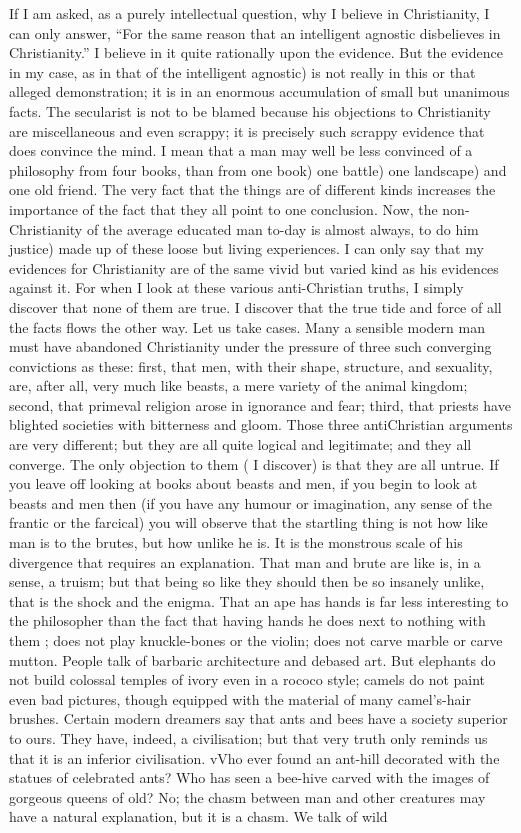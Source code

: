 \documentclass{book}
\begin{document}
If I am asked, as a purely intellectual question, why I believe in Christianity, I can only answer, “For the same reason that an intelligent agnostic disbelieves in Christianity.” I believe in it quite rationally upon the evidence. But the evidence in my case, as in that of the intelligent agnostic) is not really in this or that alleged demonstration; it is in an enormous accumulation of small but unanimous facts. The secularist is not to be blamed because his objections to Christianity are miscellaneous and even scrappy; it is precisely such scrappy evidence that does convince the mind. I mean that a man may well be less convinced of a philosophy from four books, than from one book) one battle) one landscape) and one old friend. The very fact that the things are of different kinds increases the importance of the fact that they all point to one conclusion. Now, the non-Christianity of the average educated man to-day is almost always, to do him justice) made up of these loose but living experiences. I can only say that my evidences for Christianity are of the same vivid but varied kind as his evidences against it. For when I look at these various anti-Christian truths, I simply discover that none of them are true. I discover that the true tide and force of all the facts flows the other way. Let us take cases. Many a sensible modern man must have abandoned Christianity under the pressure of three such converging convictions as these: first, that men, with their shape, structure, and sexuality, are, after all, very much like beasts, a mere variety of the animal kingdom; second, that primeval religion arose in ignorance and fear; third, that priests have blighted societies with bitterness and gloom. Those three antiChristian arguments are very different; but they are all quite logical and legitimate; and they all converge. The only objection to them ( I discover) is that they are all untrue. If you leave off looking at books about beasts and men, if you begin to look at beasts and men then (if you have any humour or imagination, any sense of the frantic or the farcical) you will observe that the startling thing is not how like man is to the brutes, but how unlike he is. It is the monstrous scale of his divergence that requires an explanation. That man and brute are like is, in a sense, a truism; but that being so like they should then be so insanely unlike, that is the shock and the enigma. That an ape has hands is far less interesting to the philosopher than the fact that having hands he does next to nothing with them ; does not play knuckle-bones or the violin; does not carve marble or carve mutton. People talk of barbaric architecture and debased art. But elephants do not build colossal temples of ivory even in a rococo style; camels do not paint even bad pictures, though equipped with the material of many camel’s-hair brushes. Certain modern dreamers say that ants and bees have a society superior to ours. They have, indeed, a civilisation; but that very truth only reminds us that it is an inferior civilisation. vVho ever found an ant-hill decorated with the statues of celebrated ants? Who has seen a bee-hive carved with the images of gorgeous queens of old? No; the chasm between man and other creatures may have a natural explanation, but it is a chasm. We talk of wild 
\end{document}

